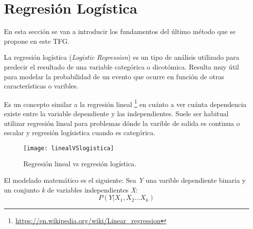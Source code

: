 \clearpage

\section{Regresión Logística}

En esta sección se van a introducir los fundamentos del último método que se propone en este TFG.\par 

La regresión logística (\textit{Logistic Regression}) es un tipo de análisis utilizado para predecir el resultado de una variable categórica o dicotómica. Resulta muy útil para modelar la probabilidad de un evento que ocurre en función de otras características o varibles.\cite{RLWiki} \cite{RLIntro} \par 

Es un concepto similar a la regresión lineal \footnote{\url{https://en.wikipedia.org/wiki/Linear_regression}} en cuánto a ver cuánta dependencia existe entre la variable dependiente y las independientes. Suele ser habitual utilizar regresión lineal para problemas dónde la varible de salida es continua o escalar y regresión logísistica cuando es categórica.\par 

\begin{figure}[h]
	\centering
	\texttt{[image: linealVSlogistica]}
	\caption{Regresión lineal vs regresión logística.}
	\label{fig:linealvslog}
\end{figure}

El modelado matemático es el siguiente:
\vspace*{0.5cm}
Sea \textit{Y} una varible dependiente binaria y un conjunto \textit{k} de variables independientes \textit{X}:
\begin{equation}
	P(Y|X_1, X_2...X_k)
\end{equation}
